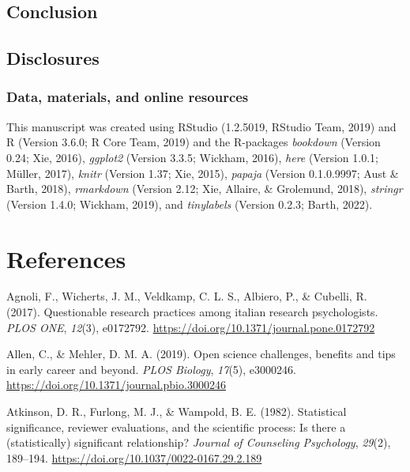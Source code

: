 \documentclass[british,,doc,mask,floatsintext]{apa6}
\begin{document}
\hypertarget{conclusion}{%
\subsection{Conclusion}\label{conclusion}}

\hypertarget{disclosures}{%
\subsection{Disclosures}\label{disclosures}}

\hypertarget{data-materials-and-online-resources}{%
\subsubsection{Data, materials, and online resources}\label{data-materials-and-online-resources}}

This manuscript was created using RStudio (1.2.5019, RStudio Team, 2019) and R (Version 3.6.0; R Core Team, 2019) and the R-packages \emph{bookdown} (Version 0.24; Xie, 2016), \emph{ggplot2} (Version 3.3.5; Wickham, 2016), \emph{here} (Version 1.0.1; Müller, 2017), \emph{knitr} (Version 1.37; Xie, 2015), \emph{papaja} (Version 0.1.0.9997; Aust \& Barth, 2018), \emph{rmarkdown} (Version 2.12; Xie, Allaire, \& Grolemund, 2018), \emph{stringr} (Version 1.4.0; Wickham, 2019), and \emph{tinylabels} (Version 0.2.3; Barth, 2022).

\hypertarget{references}{%
\section{References}\label{references}}

\setlength{\parindent}{-0.2in}
\setlength{\leftskip}{0.2in}

\hypertarget{refs}{}
\leavevmode\hypertarget{ref-Agnoli2017}{}%
Agnoli, F., Wicherts, J. M., Veldkamp, C. L. S., Albiero, P., \& Cubelli, R. (2017). Questionable research practices among italian research psychologists. \emph{PLOS ONE}, \emph{12}(3), e0172792. \url{https://doi.org/10.1371/journal.pone.0172792}

\leavevmode\hypertarget{ref-Allen2019}{}%
Allen, C., \& Mehler, D. M. A. (2019). Open science challenges, benefits and tips in early career and beyond. \emph{PLOS Biology}, \emph{17}(5), e3000246. \url{https://doi.org/10.1371/journal.pbio.3000246}

\leavevmode\hypertarget{ref-Atkinson1982}{}%
Atkinson, D. R., Furlong, M. J., \& Wampold, B. E. (1982). Statistical significance, reviewer evaluations, and the scientific process: Is there a (statistically) significant relationship? \emph{Journal of Counseling Psychology}, \emph{29}(2), 189--194. \url{https://doi.org/10.1037/0022-0167.29.2.189}
\end{document}
